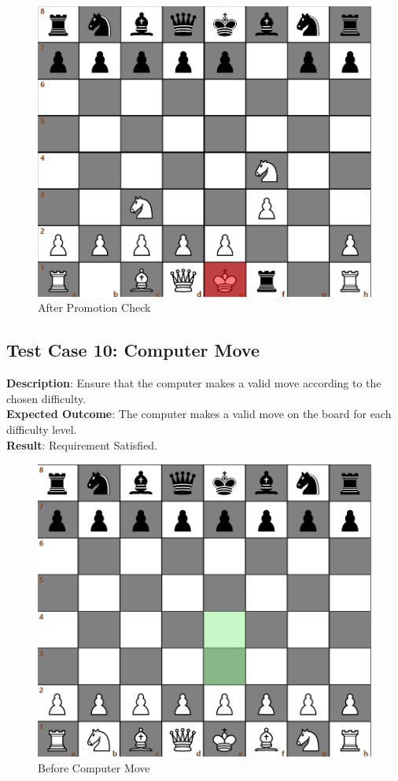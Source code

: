 \documentclass[a4paper,12pt]{article}
\begin{document}
\begin{figure}[H]
    \centering
    \includegraphics[width=0.7\linewidth]{Images/Test Cases/testCase9Img2.png}
    \caption{After Promotion Check}
    \label{fig:AfterPromotionCheck}
\end{figure}

\subsection{Test Case 10: Computer Move}
\textbf{Description}: Ensure that the computer makes a valid move according to the chosen difficulty.\\
\textbf{Expected Outcome}: The computer makes a valid move on the board for each difficulty level.\\
\textbf{Result}: Requirement Satisfied.

\begin{figure}[H]
    \centering
    \includegraphics[width=0.7\linewidth]{Images/Test Cases/testCase10Img1.png}
    \caption{Before Computer Move}
    \label{fig:BeforeComputerMove}
\end{figure}
\end{document}

